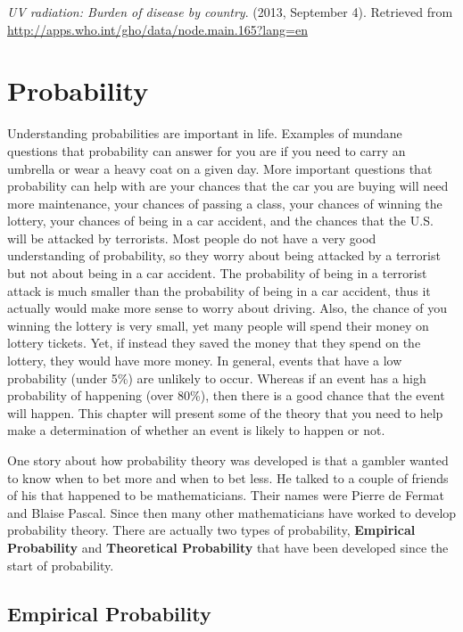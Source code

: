 \documentclass[]{book}
\begin{document}
\emph{UV radiation: Burden of disease by country}. (2013, September 4).
Retrieved from \url{http://apps.who.int/gho/data/node.main.165?lang=en}

\hypertarget{probability}{%
\chapter{Probability}\label{probability}}

Understanding probabilities are important in life. Examples of mundane questions that probability can answer for you are if you need to carry an umbrella or wear a heavy coat on a given day. More important questions that probability can help with are your chances that the car you are buying will need more maintenance, your chances of passing a class, your chances of winning the lottery, your chances of being in a car accident, and the chances that the U.S. will be attacked by terrorists. Most people do not have a very good understanding of probability, so they worry about being attacked by a terrorist but not about being in a car accident. The probability of being in a terrorist attack is much smaller than the probability of being in a car accident, thus it actually would make more sense to worry about driving. Also, the chance of you winning the lottery is very small, yet many people will spend their money on lottery tickets. Yet, if instead they saved the money that they spend on the lottery, they would have more money. In general, events that have a low probability (under 5\%) are unlikely to occur. Whereas if an event has a high probability of happening (over 80\%), then there is a good chance that the event will happen. This chapter will present some of the theory that you need to help make a determination of whether an event is likely to happen or not.

One story about how probability theory was developed is that a gambler wanted to know when to bet more and when to bet less. He talked to a couple of friends of his that happened to be mathematicians. Their names were Pierre de Fermat and Blaise Pascal. Since then many other mathematicians have worked to develop probability theory. There are actually two types of probability, \textbf{Empirical Probability} and \textbf{Theoretical Probability} that have been developed since the start of probability.

\hypertarget{empirical-probability}{%
\section{Empirical Probability}\label{empirical-probability}}
\end{document}
